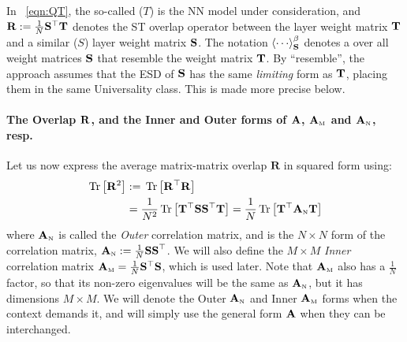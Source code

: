 In \EQN~\ref{eqn:QT}, the so-called \emph{\Teacher} ($T$) is the NN model under consideration,
and 
$\mathbf{R}:=\frac{1}{N}{{\mathbf{S}}^{\top}{\mathbf{T}}}$
denotes the ST overlap operator 
between the \Teacher layer weight matrix ${\mathbf{T}}$ and a similar \emph{\Student} ($S$) layer weight matrix ${\mathbf{S}}$.
The notation $\THRMAVGIZ{\cdots}$ denotes a \ThermalAverage over
all \Student weight matrices ${\mathbf{S}}$ that resemble the \Teacher weight matrix ${\mathbf{T}}$.
By ``resemble'', the \SETOL approach assumes that 
the ESD of ${\mathbf{S}}$ has the same \emph{limiting} form as ${\mathbf{T}}$, placing them in the same \HTSR Universality class.
This is made more precise below.

\paragraph{The Overlap $\mathbf{R}$, and the Inner and Outer forms of $\mathbf{A}$, ${\mathbf{A}}_{\text{\tiny M}}$ and ${\mathbf{A}}_{\text{\tiny N}}$, resp.}
Let us now express the average matrix-matrix overlap $\mathbf{R}$ in squared form using:
\begin{align}
  \label{eqn:R2}
\mbox{}\operatorname{Tr}\left[\mathbf{R}^{2}\right] &:=\mbox{}\operatorname{Tr}\left[\mathbf{R}^{\top}\mathbf{R}\right]  \\ \nonumber
&=\frac{1}{N^{2}}\mbox{}\operatorname{Tr}\left[{\mathbf{T}}^{\top}{\mathbf{S}}{\mathbf{S}}^{\top}{\mathbf{T}}\right]
=\frac{1}{N}\mbox{}\operatorname{Tr}\left[{\mathbf{T}}^{\top}{\mathbf{A}}_{\text{\tiny N}}{\mathbf{T}}\right]
\end{align}
where ${\mathbf{A}}_{\text{\tiny N}}$ is called the \emph{Outer} \Student correlation matrix, and is  the $N\times N$ form of the \Student correlation matrix,
${\mathbf{A}}_{\text{\tiny N}}:=\frac{1}{N}\mathbf{SS}^{\top}$.
We will also define the $M\times M$ \emph{Inner} \Student correlation matrix ${\mathbf{A}}_{\text{\tiny M}}=\frac{1}{N}{\mathbf{S}}^{\top}{\mathbf{S}}$, which is 
used later. Note that ${\mathbf{A}}_{\text{\tiny M}}$ also has a $\frac 1 N$ factor, so that its non-zero eigenvalues will be the same as ${\mathbf{A}}_{\text{\tiny N}}$, but it has dimensions $M \times M$. We will denote the Outer ${\mathbf{A}}_{\text{\tiny N}}$ and Inner ${\mathbf{A}}_{\text{\tiny M}}$ forms when the context demands it, and will simply use the general form $\mathbf{A}$ when they can be interchanged.


